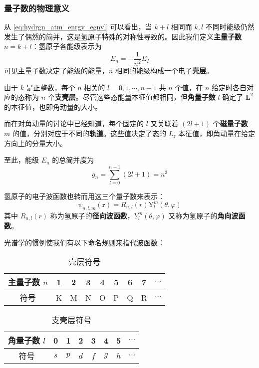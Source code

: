 \documentclass[cn,10pt,math=newtx,citestyle=gb7714-2015,bibstyle=gb7714-2015]{elegantbook}
\def\bm{\boldsymbol}
\def\mr{\mathrm}
\def\vphi{\varphi}
\begin{document}
\subsubsection{量子数的物理意义}

从 \ref{eq:hydrgn_atm_enrgy_egnvl} 可以看出，当 $k+l$ 相同而 $k,l$ 不同时能级仍然发生了偶然的简并，这是氢原子特殊的对称性导致的。因此我们定义\textbf{主量子数} $n=k+l$：氢原子各能级表示为
\begin{equation}\label{eq:hydrgn_enrgy_lvl}
    E_n=-\frac 1{n^2}E_I
\end{equation}
可见主量子数决定了能级的能量，$n$ 相同的能级构成一个电子\textbf{壳层}。

由于 $k$ 是正整数，每个 $n$ 相关的 $l=0,1,\cdots,n-1$ 共 $n$ 个值，在 $n$ 给定时各自对应的态称为 $n$ 个\textbf{支壳层}。尽管这些态能量本征值都相同，但\textbf{角量子数} $l$ 确定了 $\bm L^2$ 的本征值，也即角动量的大小。

而在对角动量的讨论中已经知道，每个固定的 $l$ 又关联着 $(2l+1)$ 个\textbf{磁量子数} $m$ 的值，分别对应于不同的\textbf{轨道}。这些值决定了态的 $L_z$ 本征值，即角动量在给定方向上的分量大小。

至此，能级 $E_n$ 的总简并度为
\begin{equation}
    g_n=\sum_{l=0}^{n-1}(2l+1)=n^2
\end{equation}

氢原子的电子波函数也转而用这三个量子数来表示：
\begin{equation}
    \psi_{n,l,m}(\bm r) = R_{n,l}(r)\mr Y_l^m(\theta,\vphi)
\end{equation}
其中 $R_{n,l}(r)$ 称为氢原子的\textbf{径向波函数}，$Y_l^m(\theta,\vphi)$ 又称为氢原子的\textbf{角向波函数}。

光谱学的惯例使我们有以下命名规则来指代波函数：
\begin{table}[!hbtp]\label{tab:shell}
    \centering
    \caption{壳层符号}
    \begin{tabular}{c|cccccccc}
        \toprule
        主量子数 $n$ & 1 & 2 & 3 & 4 & 5 & 6 & 7 & $\cdots$ \\
        \midrule
        符号 & K & M & N & O & P & Q &R & $\cdots$\\
        \bottomrule
    \end{tabular}
\end{table}

\begin{table}[!hbtp]\label{tab:subshell}
    \centering
    \caption{支壳层符号}
    \begin{tabular}{c|ccccccc}
    \toprule
        角量子数 $l$ & 0 & 1 & 2 & 3 & 4 & 5 & $\cdots$ \\
        \midrule
        符号 & $s$ & $p$ & $d$ & $f$ & $g$ & $h$ & $\cdots$\\
        \bottomrule
    \end{tabular}
\end{table}
\end{document}
